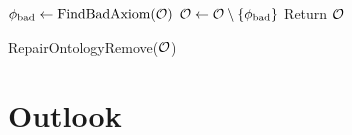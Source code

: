 \documentclass[
]{ceurart}
\begin{document}
\begin{algorithm}[t]
  \begin{algorithmic}
      \State $\phi_\textnormal{bad} \gets \textnormal{FindBadAxiom}(\mathcal{O})$
      \State $\mathcal{O} \gets \mathcal{O} \setminus \{\phi_\textnormal{bad}\}$
    \EndWhile
    \State Return $\mathcal{O}$
  \end{algorithmic}
  \caption{RepairOntologyRemove($\mathcal{O}$)}
	\label{algo:repair-remove}
\end{algorithm}


\section{Outlook}




\appendix
\end{document}
